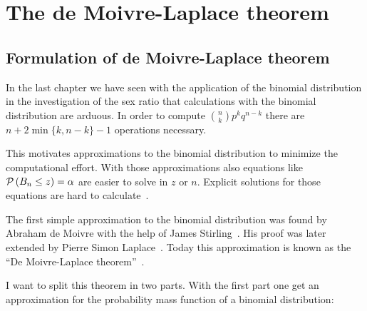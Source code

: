 \chapter{The de Moivre-Laplace theorem}

\section{Formulation of de Moivre-Laplace theorem}



In the last chapter we have seen with the application of the binomial distribution in the investigation of the sex ratio that calculations with the binomial distribution are arduous. In order to compute $\binom nk p^kq^{n-k}$ there are $n+2\min\{k,n-k\}-1$ operations necessary.

This motivates approximations to the binomial distribution to minimize the computational effort. With those approximations also equations like $\mathcal P\left({B_{n} \le z}\right)=\alpha$ are easier to solve in $z$ or $n$. Explicit solutions for those equations are hard to calculate~\cite[p. 469]{hald1}.

The first simple approximation to the binomial distribution was found by Abraham de Moivre with the help of James Stirling~\cite[p. 469]{hald1}. His proof was later extended by Pierre Simon Laplace~\cite[pp. 495 ff.]{hald1}. Today this approximation is known as the ``De Moivre-Laplace theorem''~\cite[pp. 64-67]{irle}.

I want to split this theorem in two parts. With the first part one get an approximation for the probability mass function of a binomial distribution:


